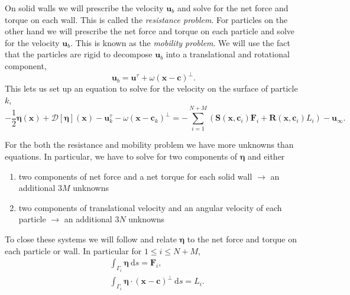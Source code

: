 \documentclass[preprint, 10pt]{elsarticle}
\begin{document}
On solid walls we will prescribe the velocity $\mathbf{u}_b$ and solve for the net force and torque on each wall. This is called the \textit{resistance problem}. For particles on the other hand we will prescribe the net force and torque on each particle and solve for the velocity $\mathbf{u}_b$. This is known as the \textit{mobility problem}. We will use the fact that the particles are rigid to decompose $\mathbf{u}_b$ into a translational and rotational component,
\[ \mathbf{u}_b = \mathbf{u}^\tau + \omega(\mathbf{x}-\mathbf{c})^\perp.\]
This lets us set up an equation to solve for the velocity on the surface of particle $k$,
\begin{equation}\label{eq:vel_particles} -\frac{1}{2}\pmb{\eta}(\mathbf{x}) + \mathcal{D}[\pmb{\eta}](\mathbf{x}) - \mathbf{u}^\tau_k - \omega(\mathbf{x}-\mathbf{c}_k)^\perp =  -\sum\limits_{i=1}^{N+M} \left(\mathbf{S}(\mathbf{x},\mathbf{c}_i)\mathbf{F}_i + \mathbf{R}(\mathbf{x},\mathbf{c}_i)L_i\right) - \mathbf{u}_\infty.\end{equation}

For the both the resistance and mobility problem we have more unknowns than equations. In particular, we have to solve for two components of $\pmb{\eta}$ and either 
\begin{enumerate}[label=(\alph*)]
	\item two components of net force and a net torque for each solid wall $\rightarrow$ an additional $3M$ unknowns
	\item two components of translational velocity and an angular velocity of each particle $\rightarrow$ an additional $3N$ unknowns
\end{enumerate}

To close these systems we will follow \cite{Power1993} and relate $\pmb{\eta}$ to the net force and torque on each particle or wall. In particular for $1\leq i \leq N+M$,
\begin{subequations}\label{eq:closure}
\begin{align}
	&\int_{\Gamma_i} \pmb{\eta}~\text{d}s = \mathbf{F}_i,\\
	&\int_{\Gamma_i} \pmb{\eta}\cdot (\mathbf{x} - \mathbf{c})^\perp~\text{d}s = L_i.
\end{align} 
\end{subequations}
\end{document}
